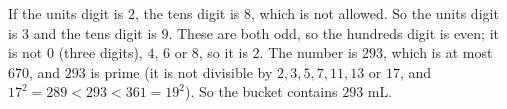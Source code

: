 If the units digit is $2$, the tens digit is $8$, which is not allowed. So the units digit is $3$ and the tens digit is $9$. These are both odd, so the hundreds digit is even; it is not $0$ (three digits), $4$, $6$ or $8$, so it is $2$. The number is $293$, which is at most $670$, and $293$ is prime (it is not divisible by $2,3,5,7,11,13$ or $17$, and $17^2=289<293<361=19^2$). So the bucket contains $\boxed{293}$ mL.
